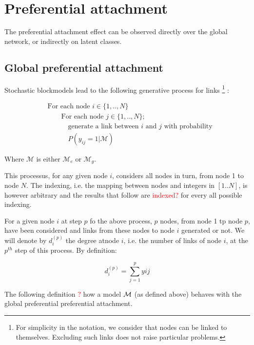 \section{Preferential attachment}
\label{sec:burstiness}

The preferential attachment effect can be observed directly over the global network, or indirectly on latent classes.

\subsection{Global preferential attachment}

Stochastic blockmodels lead to the following generative process for links \footnote{For simplicity in the notation, we consider that nodes can be linked to themselves. Excluding such links does not raise particular problems.} :

\begin{align*}
    &\textrm{For each node } i \in \{1, .., N\}  \\
    &\qquad\textrm{For each node } j \in \{1, .., N\}; \\
    &\quad \qquad\textrm{generate a link between } i \textrm{ and } j \textrm{ with probability} \\
    &\quad \qquad P(y_{ij}=1 | \mathcal{M})
\end{align*}

Where $\mathcal{M}$ is either $\mathcal{M}_e$ or $\mathcal{M}_g$.

This processus, for any given node $i$, considers all nodes in turn, from node 1 to node $N$. The indexing, i.e. the mapping between nodes and integers in $[1..N]$, is however arbitrary and the results that follow are \textcolor{red}{indexed?} for every all possible indexing.

For a given node $i$ at step $p$ fo the above process, $p$ nodes, from node 1 tp node $p$, have been considered and links from these nodes to node $i$ generated or not. We will denote by $d_i^{(p)}$ the degree atnode $i$, i.e. the number of links of node $i$, at the $p^{th}$ step of this process. By definition:

\begin{equation*}
d_i^{(p)} = \sum_{j=1}^p yij
\end{equation*}

The following definition \textcolor{red}{?} how a model $\mathcal{M}$ (as defined above) behaves with the global preferential preferential attachment.

